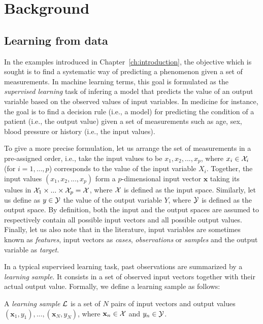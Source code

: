 \chapter{Background}\label{ch:background}

\section{Learning from data}

In the examples introduced in Chapter~\ref{ch:introduction}, the objective
which is sought is to find a systematic way of predicting a phenomenon given a
set of measurements. In machine learning terms, this goal is formulated as the
{\it supervised learning} task of infering a model that predicts the value of
an output variable based on the observed values of input variables. In
medicine for instance, the goal is to find a decision rule (i.e., a model) for
predicting the condition of a patient (i.e., the output value) given a set of
measurements such as age, sex, blood pressure or history (i.e., the input
values).

To give a more precise formulation, let us arrange the set of measurements in a
pre-assigned order, i.e., take the input values to be $x_1, x_2, ..., x_p$,
where $x_i \in {\cal X}_i$ (for $i = 1, ..., p$) corresponds to the value of
the input variable $X_i$. Together, the input values $(x_1, x_2, ..., x_p)$
form a $p$-dimensional input vector $\mathbf{x}$ taking its values in ${\cal
X}_1 \times ... \times {\cal X}_p = {\cal X}$, where ${\cal X}$ is defined as
the input space. Similarly, let us define as $y \in {\cal Y}$ the value of the
output variable $Y$, where ${\cal Y}$ is defined as the output space. By
definition, both the input and the output spaces are assumed to respectively
contain all possible input vectors and all possible output values. Finally, let us also
note that in the literature, input variables are sometimes known as {\it features},
input vectors as {\it cases}, {\it observations} or {\it samples} and the
output variable as {\it target}.

In a typical supervised learning task, past observations are summarized by a
{\it learning sample}. It consists in a set of observed input
vectors together with their actual output value. Formally, we define a learning
sample as follows:

\begin{definition}
A \emph{learning sample} ${\cal L}$ is a set of $N$
pairs of input vectors and output values $(\mathbf{x}_1, y_1), ...,
(\mathbf{x}_N, y_N)$, where $\mathbf{x}_n \in {\cal X}$ and $y_n \in {\cal Y}$.
\end{definition}



